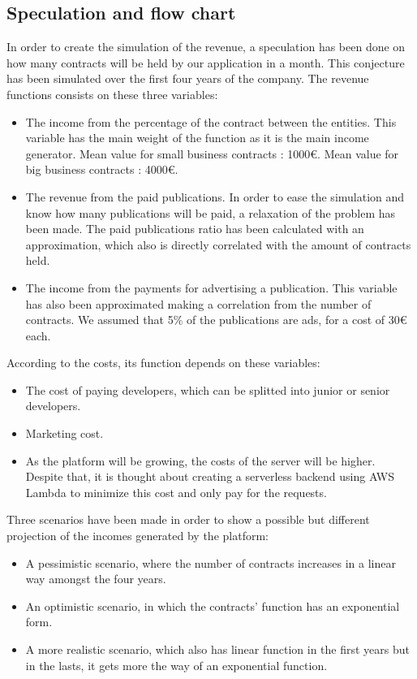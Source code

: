 \documentclass[./main.tex]{subfiles}
\begin{document}
\subsection{Speculation and flow chart}
In order to create the simulation of the revenue, a speculation has been done on how many contracts will be held by our application in a month. This conjecture has been simulated over the first four years of the company. The revenue functions consists on these three variables:
\begin{itemize}
	\item The income from the percentage of the contract between the entities. This variable has the main weight of the function as it is the main income generator. Mean value for small business contracts : 1000€. Mean value for big business contracts : 4000€. 
	\item The revenue from the paid publications. In order to ease the simulation and know how many publications will be paid, a relaxation of the problem has been made. The paid publications ratio has been calculated with an approximation, which also is directly correlated with the amount of contracts held.
	\item The income from the payments for advertising a publication. This variable has also been approximated making a correlation from the number of contracts. We assumed that 5\% of the publications are ads, for a cost of 30€ each.
\end{itemize}
According to the costs, its function depends on these variables:
\begin{itemize}
	\item The cost of paying developers, which can be splitted into junior or senior developers.
	\item Marketing cost.
	\item As the platform will be growing, the costs of the server will be higher. Despite that, it is thought about creating a serverless backend using AWS Lambda to minimize this cost and only pay for the requests.
\end{itemize}
Three scenarios have been made in order to show a possible but different projection of the incomes generated by the platform:
\begin{itemize}
	\item A pessimistic scenario, where the number of contracts increases in a linear way amongst the four years.
	\item An optimistic scenario, in which the contracts’ function has an exponential form.
	\item A more realistic scenario, which also has linear function in the first years but in the lasts, it gets more the way of an exponential function.
\end{itemize}
\end{document}
